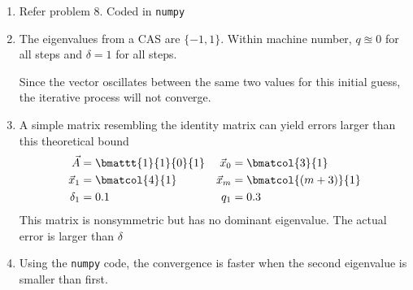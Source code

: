 \begin{enumerate}
\begin{enumerate}
              \item Refer problem $ 8 $. Coded in \texttt{numpy}

              \item The eigenvalues from a CAS are $ \{-1, 1\} $. Within machine number,
                    $ q \approxeq 0 $ for all steps and $ \delta = 1 $ for all steps.
                    \par Since the vector oscillates between the same two values for
                    this initial guess, the iterative process will not converge.

              \item A simple matrix resembling the identity matrix can yield
                    errors larger than this theoretical bound
                    \begin{align}
                        \vec{A}   & = \bmattt{1}{1}{0}{1} &
                        \vec{x}_0 & = \bmatcol{3}{1}        \\
                        \vec{x}_1 & = \bmatcol{4}{1}      &
                        \vec{x}_m & = \bmatcol{(m+3)}{1}    \\
                        \delta_1  & = 0.1                 &
                        q_1       & = 0.3
                    \end{align}
                    This matrix is nonsymmetric but has no dominant eigenvalue.
                    The actual error is larger than $ \delta $

              \item Using the \texttt{numpy} code, the convergence is faster when
                    the second eigenvalue is smaller than first.
          \end{enumerate}
\end{enumerate}